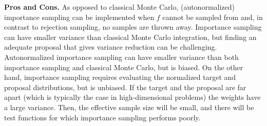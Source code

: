 \medskip
\noindent\textbf{Pros and Cons.}
As opposed to classical Monte Carlo, (autonormalized) importance sampling can be
implemented when $f$ cannot be sampled from and, in contrast to rejection
sampling, no samples are thrown away. Importance sampling can have smaller
variance than classical Monte Carlo integration, but finding an adequate proposal
that gives variance reduction can be challenging. Autonormalized importance
sampling can have smaller variance than both importance sampling and classical
Monte Carlo, but is biased. On the other hand, importance sampling requires
evaluating the normalized target and proposal distributions, but is unbiased. If
the target and the proposal are far apart (which is typically the case in
high-dimensional problems) the weights have a large variance. Then, the effective
sample size will be small, and there will be test functions for which importance
sampling performs poorly.
